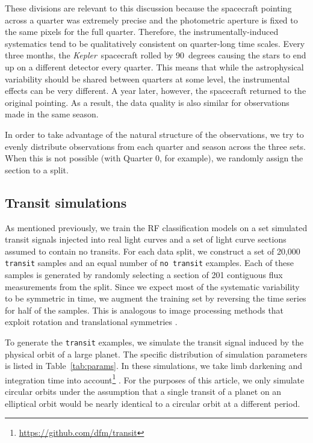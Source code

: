 \documentclass[12pt,preprint]{aastex}
\newcommand{\project}[1]{\textsl{#1}}
\newcommand{\kepler}{\project{Kepler}}
\newcommand{\paper}{article}
\newcommand{\Tab}[1]{Table~\ref{tab:#1}}
\newcommand{\tab}[1]{\Tab{#1}}
\begin{document}
These divisions are relevant to this discussion because the spacecraft
pointing across a quarter was extremely precise and the photometric aperture
is fixed to the same pixels for the full quarter.
Therefore, the instrumentally-induced systematics tend to be qualitatively
consistent on quarter-long time scales.
Every three months, the \kepler\ spacecraft rolled by 90~degrees causing the
stars to end up on a different detector every quarter.
This means that while the astrophysical variability should be shared between
quarters at some level, the instrumental effects can be very different.
A year later, however, the spacecraft returned to the original pointing.
As a result, the data quality is also similar for observations made in the
same season.

In order to take advantage of the natural structure of the observations, we
try to evenly distribute observations from each quarter and season across the
three sets.
When this is not possible (with Quarter 0, for example), we randomly assign
the section to a split.


\subsection{Transit simulations}

As mentioned previously, we train the RF classification models on a set
simulated transit signals injected into real light curves and a set of light
curve sections assumed to contain no transits.
For each data split, we construct a set of 20,000 \texttt{transit} samples and
an equal number of \texttt{no transit} examples.
Each of these samples is generated by randomly selecting a section of 201
contiguous flux measurements from the split.
Since we expect most of the systematic variability to be symmetric in time, we
augment the training set by reversing the time series for half of the samples.
This is analogous to image processing methods that exploit rotation and
translational symmetries \citep[for an example from astronomy
see][]{Dieleman:2015}.

To generate the \texttt{transit} examples, we simulate the transit signal
induced by the physical orbit of a large planet.
The specific distribution of simulation parameters is listed in \tab{params}.
In these simulations, we take limb darkening and integration time into
account\footnote{\url{https://github.com/dfm/transit}}
\citep{Mandel:2002, Kipping:2010}.
For the purposes of this \paper, we only simulate circular orbits under the
assumption that a single transit of a planet on an elliptical orbit would be
nearly identical to a circular orbit at a different period.
\end{document}
